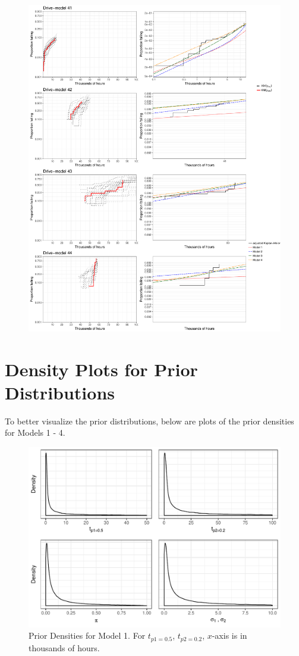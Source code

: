 \documentclass[12pt]{article}
\begin{document}
\begin{figure}[H]
\includegraphics[width=\textwidth]{ppcheck-v3-11.pdf}
\end{figure}
\clearpage


\section{Density Plots for Prior Distributions}
To better visualize the prior distributions, below are plots of
the prior densities for Models 1 - 4.
\begin{figure}[H]
\center
\includegraphics[width=\textwidth]{priorsmod1.pdf}
\caption{Prior Densities for Model 1.  For $t_{p1 = 0.5}$, $t_{p2 = 0.2}$, $x$-axis is in thousands of hours.}
\end{figure}
\end{document}
